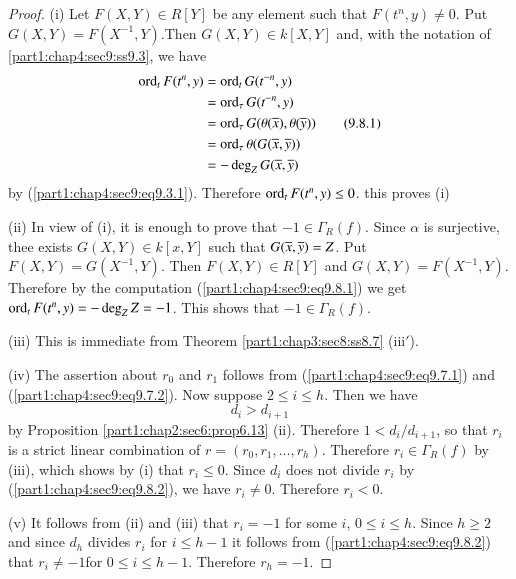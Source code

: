 \begin{proof}
  (i) Let $F(X, Y) \in R [Y]$ be any element such that $F(t^n, y) \neq 0$. Put $G(X, Y)= F(X^{-1}, Y)$.\pageoriginale Then $G(X, Y) \in k [X, Y]$ and, with the notation of \ref{part1:chap4:sec9:ss9.3}, we have
\begin{equation*}
\begin{aligned}
  \operatorname{ord}_t F(t^n, y) & =\operatorname{ord}_t G(t^{-n}, y)\\
  & =\operatorname{ord}_\tau G(t^{-n}, y)\\
  & = \operatorname{ord}_\tau G(\theta (\overline{x}), \theta (\overline{y}))\\
  & = \operatorname{ord}_\tau \theta (G (\overline{x}, \overline{y}))\\
  & = - \deg_Z G(\overline{x}, \overline{y})
\end{aligned}\tag{9.8.1}\label{part1:chap4:sec9:eq9.8.1}
\end{equation*}
by (\ref{part1:chap4:sec9:eq9.3.1}). Therefore $\operatorname{ord}_t F(t^n, y)\leq 0$. this proves (i)

(ii) In view of (i), it is enough to prove that $-1 \in \Gamma_R (f)$. Since $\alpha$ is surjective, thee exists $G(X, Y) \in k [x, Y]$ such that $G(\overline{x}, \overline{y})= Z$. Put $F(X, Y)= G(X^{-1}, Y)$. Then $F(X, Y) \in R[Y]$ and $G(X, Y)= F(X^{-1}, Y)$. Therefore by the computation (\ref{part1:chap4:sec9:eq9.8.1}) we get $\operatorname{ord}_t F(t^n, y)=- \deg_Z Z=-1$. This shows that $-1 \in \Gamma_R (f)$.

(iii) This is immediate from Theorem \ref{part1:chap3:sec8:ss8.7} (iii$'$).

(iv) The assertion about $r_0$ and $r_1$ follows from (\ref{part1:chap4:sec9:eq9.7.1}) and (\ref{part1:chap4:sec9:eq9.7.2}). Now suppose $2 \leq i \leq h$. Then we have
\begin{equation*}
  d_i > d_{i+1}\tag{9.8.2} \label{part1:chap4:sec9:eq9.8.2}
\end{equation*}
by Proposition \ref{part1:chap2:sec6:prop6.13} (ii). Therefore $1< d_i/d_{i+1}$, so that $r_i$ is a strict linear combination of $r= (r_0, r_1, \ldots, r_h)$. Therefore $r_i \in \Gamma_R (f)$ by (iii), which shows by (i) that $r_i\leq 0$. Since $d_i$ does not divide $r_i$ by (\ref{part1:chap4:sec9:eq9.8.2}), we have $r_i \neq 0$. Therefore $r_i < 0$.

(v) It follows from (ii) and (iii) that $r_i=-1$ for some $i$, $0 \leq i \leq h$. Since $h \geq 2$ and since $d_h$ divides $r_i$ for $i \leq h-1$ it follows from (\ref{part1:chap4:sec9:eq9.8.2})  that $r_i\neq -1$\pageoriginale for $0 \leq i \leq h-1$. Therefore $r_h=-1$.
\end{proof}


